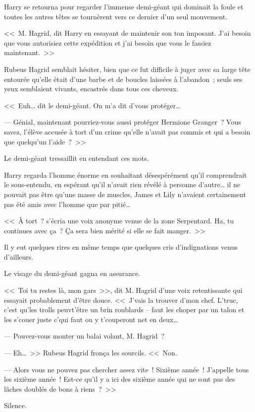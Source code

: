Harry se retourna pour regarder l'immense demi-géant qui dominait la foule et toutes les autres têtes se tournèrent vers ce dernier d'un seul mouvement.

<<~M. Hagrid, dit Harry en essayant de maintenir son ton imposant. J'ai besoin que vous autorisiez cette expédition et j'ai besoin que vous le fassiez maintenant.~>>

Rubeus Hagrid semblait hésiter, bien que ce fut difficile à juger avec sa large tête entourée qu'elle était d'une barbe et de boucles laissées à l'abandon~; seuls ses yeux semblaient vivants, encastrés dans tous ces cheveux.

<<~Euh… dit le demi-géant. On m'a dit d'vous protéger…

--- Génial, maintenant pourriez-vous aussi protéger Hermione Granger~? Vous savez, l'élève accusée à tort d'un crime qu'elle n'avait pas commis et qui a besoin que quelqu'un l'aide~?~>>

Le demi-géant tressaillit en entendant ces mots.

Harry regarda l'homme énorme en souhaitant désespérément qu'il comprendrait le sous-entendu, en espérant qu'il n'avait rien révélé à personne d'autre… il ne pouvait pas être qu'une masse de muscles, James et Lily n'avaient certainement pas été amis avec l'homme que par pitié…

<<~À tort~? s'écria une voix anonyme venue de la zone Serpentard. Ha, tu continues avec ça~? Ça sera bien mérité si elle se fait manger.~>>

Il y eut quelques rires en même temps que quelques cris d'indignations venus d'ailleurs.

Le visage du demi-géant gagna en assurance.

<<~Toi tu restes là, mon gars~>>, dit M. Hagrid d'une voix retentissante qui essayait probablement d'être douce. <<~J'vais la trouver d'mon chef. L'truc, c'est qu'les trolls peuvt'être un brin roublards -- faut les choper par un talon et les s'couer juste c'qui faut ou y t'couperont net en deux…

--- Pouvez-vous monter un balai volant, M. Hagrid~?

--- Eh…~>> Rubeus Hagrid fronça les sourcils. <<~Non.

--- Alors vous ne pouvez pas chercher assez vite~! Sixième année~! J'appelle tous les sixième année~! Est-ce qu'il y a ici des sixième année qui ne sont pas des lâches doublés de bons à riens~?~>>

Silence.

